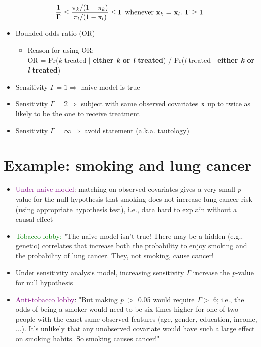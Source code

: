 \documentclass[11pt]{article}
\begin{document}
\[
	\frac{1}{\Gamma} \leq \frac{\pi_k / (1 - \pi_k)}{\pi_l / (1 - \pi_l)} \leq \Gamma \text{    whenever \textbf{x}$_k$ = \textbf{x}$_l$. $\Gamma \geq 1$}
.\] 

\begin{itemize}
	\item Bounded odds ratio (OR)
		\begin{itemize}
			\item Reason for using OR: \\
			OR = Pr(\textit{k} treated $|$ \textbf{either \textit{k} or \textit{l} treated}) / Pr(\textit{l} treated $|$  \textbf{either \textit{k} or \textit{l} treated})
		\end{itemize}
	\item Sensitivity $\Gamma = 1 \Rightarrow$ naive model is true  
	\item Sensitivity $\Gamma = 2 \Rightarrow$ subject with same observed covariates \textbf{x} up to twice as likely to be the one to receive treatment 
	\item Sensitivity $\Gamma = \infty \Rightarrow$ avoid statement (a.k.a. tautology) 
\end{itemize}

\section*{Example: smoking and lung cancer}

\begin{itemize}
	\item \textcolor{purple}{Under naive model}: matching on observed covariates gives a very small \textit{p}-value for the null hypothesis that smoking does not increase lung cancer risk (using appropriate hypothesis test), i.e., data hard to explain without a causal effect
	\item \textcolor{green}{Tobacco lobby:} "The naive model isn't true! There may be a hidden (e.g., genetic) correlates that increase both the probability to enjoy smoking and the probability of lung cancer. They, not smoking, cause cancer!
	\item Under sensitivity analysis model, increasing sensitivity $\Gamma$ increase the  \textit{p}-value for null hypothesis
	\item \textcolor{purple}{Anti-tobacco lobby}: "But making \textit{p} $>$ 0.05 would require  $\Gamma >$ 6; i.e., the odds of being a smoker would need to be six times higher for one of two people with the exact same observed features (age, gender, education, income, ...). It's unlikely that any unobserved covariate would have such a large effect on smoking habits. So smoking causes cancer!"
\end{itemize}
\end{document}
